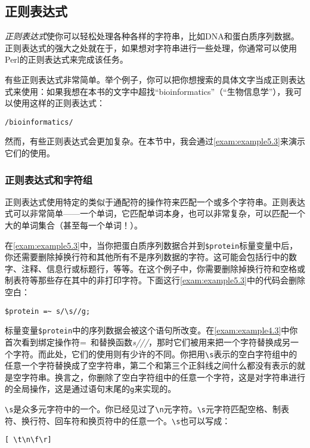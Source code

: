 \subsection{正则表达式}
\textit{正则表达式}使你可以轻松处理各种各样的字符串，比如DNA和蛋白质序列数据。正则表达式的强大之处就在于，如果想对字符串进行一些处理，你通常可以使用Perl的正则表达式来完成该任务。

有些正则表达式非常简单。举个例子，你可以把你想搜索的具体文字当成正则表达式来使用：如果我想在本书的文字中超找“bioinformatics”（“生物信息学”），我可以使用这样的正则表达式：

\begin{lstlisting}
/bioinformatics/
\end{lstlisting}

然而，有些正则表达式会更加复杂。在本节中，我会通过\autoref{exam:example5.3}来演示它们的使用。

\subsubsection{正则表达式和字符组}
正则表达式使用特定的类似于通配符的操作符来匹配一个或多个字符串。正则表达式可以非常简单——一个单词，它匹配单词本身，也可以非常复杂，可以匹配一个大的单词集合（甚至每一个单词！）。

在\autoref{exam:example5.3}中，当你把蛋白质序列数据合并到\verb|$protein|标量变量中后，你还需要删除掉换行符和其他所有不是序列数据的字符。这可能会包括行中的数字、注释、信息行或标题行，等等。在这个例子中，你需要删除掉换行符和空格或制表符等那些存在其中的非打印字符。下面这行\autoref{exam:example5.3}中的代码会删除空白：

\begin{lstlisting}
$protein =~ s/\s//g;
\end{lstlisting}

标量变量\verb|$protein|中的序列数据会被这个语句所改变。在\autoref{exam:example4.3}中你首次看到绑定操作符=~和替换函数\textit{s///}，那时它们被用来把一个字符替换成另一个字符。而此处，它们的使用则有少许的不同。你把用\verb|\s|表示的空白字符组中的任意一个字符替换成了空字符串，第二个和第三个正斜线之间什么都没有表示的就是空字符串。换言之，你删除了空白字符组中的任意一个字符，这是对字符串进行的全局操作，这是通过语句末尾的\verb|g|来实现的。

\verb|\s|是众多元字符中的一个。你已经见过了\verb|\n|元字符。\verb|\s|元字符匹配空格、制表符、换行符、回车符和换页符中的任意一个。\verb|\s|也可以写成：

\begin{lstlisting}
[ \t\n\f\r]
\end{lstlisting}

